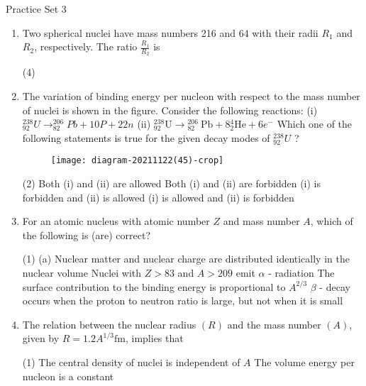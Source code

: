 \newpage
\begin{abox}
	Practice Set 3 
\end{abox}
\begin{enumerate}
	\item Two spherical nuclei have mass numbers 216 and 64 with their radii $R_{1}$ and $R_{2}$, respectively. The ratio $\frac{R_{1}}{R_{2}}$ is
{	}
\begin{tasks}(4)
\end{tasks}
\item The variation of binding energy per nucleon with respect to the mass number of nuclei is shown in the figure.
Consider the following reactions:
(i) ${ }_{92}^{238} U \rightarrow_{82}^{206} P b+10 P+22 n$
(ii) ${ }_{92}^{238} \mathrm{U} \rightarrow{ }_{82}^{206} \mathrm{~Pb}+8{ }_{2}^{4} \mathrm{He}+6 e^{-}$
Which one of the following statements is true for the given decay modes of ${ }_{92}^{238} U$ ?
{}
\begin{figure}[H]
	\centering
	\texttt{[image: diagram-20211122(45)-crop]}
\end{figure}
\begin{tasks}(2)
	\task[\textbf{A.}]Both (i) and (ii) are allowed
	\task[\textbf{B.}]Both (i) and (ii) are forbidden
	\task[\textbf{C.}](i) is forbidden and (ii) is allowed
	\task[\textbf{D.}](i) is allowed and (ii) is forbidden
\end{tasks}
	\item For an atomic nucleus with atomic number $Z$ and mass number $A$, which of the following is (are) correct?
{	}
\begin{tasks}(1)
\task[\textbf{A.}](a) Nuclear matter and nuclear charge are distributed identically in the nuclear volume
\task[\textbf{B.}]Nuclei with $Z>83$ and $A>209$ emit $\alpha$ - radiation
\task[\textbf{C.}] The surface contribution to the binding energy is proportional to $A^{2 / 3}$
\task[\textbf{D.}]$\beta$ - decay occurs when the proton to neutron ratio is large, but not when it is small
\end{tasks}
	\item The relation between the nuclear radius $(R)$ and the mass number $(A)$, given by $R=1.2 A^{1 / 3} \mathrm{fm}$, implies that
{	}
\begin{tasks}(1)
\task[\textbf{A.}]The central density of nuclei is independent of $A$
\task[\textbf{B.}]The volume energy per nucleon is a constant

\end{tasks}
\end{enumerate}
